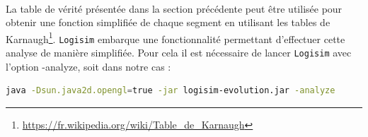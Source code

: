 \documentclass{article}
\begin{document}
    \paragraph{}
    La table de vérité présentée dans la section précédente peut être utilisée pour obtenir une fonction simplifiée de chaque segment en utilisant les tables de Karnaugh\footnote{\url{https://fr.wikipedia.org/wiki/Table_de_Karnaugh}}.
    \texttt{Logisim} embarque une fonctionnalité permettant d'effectuer cette analyse de manière simplifiée.
    Pour cela il est nécessaire de lancer \texttt{Logisim} avec l'option -analyze, soit dans notre cas :

    \begin{lstlisting}[language=bash]
java -Dsun.java2d.opengl=true -jar logisim-evolution.jar -analyze
    \end{lstlisting}
\end{document}
